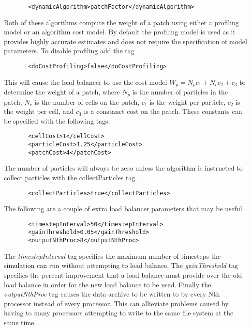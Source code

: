 \begin{Verbatim}
       <dynamicAlgorithm>patchFactor</dynamicAlgorithm>
\end{Verbatim}

Both of these algorithms compute the weight of a patch using either a profiling model 
or an algorithm cost model.  By default  the profiling model is used as it provides 
highly accurate estimates and does not require the specification of model parameters.  
To disable profiling add the tag

\begin{Verbatim}
       <doCostProfiling>false</doCostProfiling>
\end{Verbatim}

This will cause the load balancer to use the cost model $W_p=N_pc_1+N_cc_2+c_3$ to 
determine the weight of a patch, where $N_p$ is the number of particles 
in the patch, $N_c$ is the number of cells on the patch, $c_1$ is the weight per
particle, $c_2$ is the weight per cell, and $c_3$ is a constanct cost on the
patch.  These constants can be specified with the following tags:

\begin{Verbatim}
       <cellCost>1</cellCost>
       <particleCost>1.25</particleCost>
       <patchCost>4</patchCost>
\end{Verbatim}

The number of particles will always be zero unless the algorithm is instructed to
collect particles with the collectParticles tag.  

\begin{Verbatim}
       <collectParticles>true</collectParticles>
\end{Verbatim}

The following are a couple of extra load balancer parameters that may be useful.
\begin{Verbatim}
       <timestepInterval>50</timestepInterval>
       <gainThreshold>0.05</gainThreshold>
       <outputNthProc>8</outputNthProc>
\end{Verbatim}

The \emph{timestepInterval} tag specifies the maximum number of timesteps the simulation
can run without attempting to load balance.  The \emph{gainThreshold} tag specifies the 
percent improvement that a load balance must provide over the old load balance in 
order for the new load balance to be used.  Finally the \emph{outputNthProc} tag causes
the data archive to be written to by every Nth processor instead of every processor.  
This can allieviate problems caused by having to many processors attempting to write 
to the same file system at the same time. 

